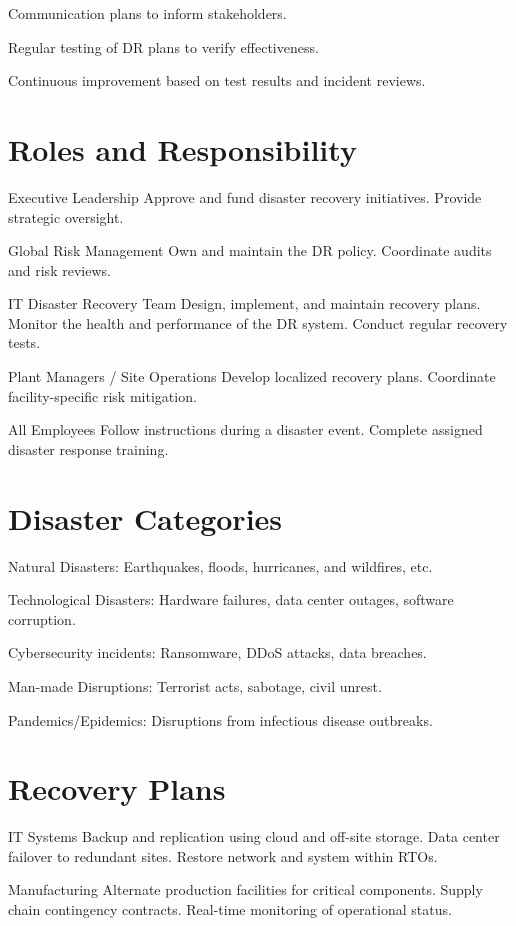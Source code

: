 Communication plans to inform stakeholders.

Regular testing of DR plans to verify effectiveness.

Continuous improvement based on test results and incident reviews.

\section{Roles and Responsibility}

Executive Leadership
    Approve and fund disaster recovery initiatives.
    Provide strategic oversight.

Global Risk Management
    Own and maintain the DR policy.
    Coordinate audits and risk reviews.

IT Disaster Recovery Team
    Design, implement, and maintain recovery plans.
    Monitor the health and performance of the DR system.
    Conduct regular recovery tests.

Plant Managers / Site Operations
    Develop localized recovery plans.
    Coordinate facility-specific risk mitigation.

All Employees
    Follow instructions during a disaster event.
    Complete assigned disaster response training.

\section{Disaster Categories}

Natural Disasters: Earthquakes, floods, hurricanes, and wildfires, etc.

Technological Disasters: Hardware failures, data center outages, software corruption.

Cybersecurity incidents: Ransomware, DDoS attacks, data breaches.

Man-made Disruptions: Terrorist acts, sabotage, civil unrest.

Pandemics/Epidemics: Disruptions from infectious disease outbreaks.
\section{Recovery Plans}

IT Systems
    Backup and replication using cloud and off-site storage.
    Data center failover to redundant sites.
    Restore network and system within RTOs.

Manufacturing
    Alternate production facilities for critical components.
    Supply chain contingency contracts.
    Real-time monitoring of operational status.

